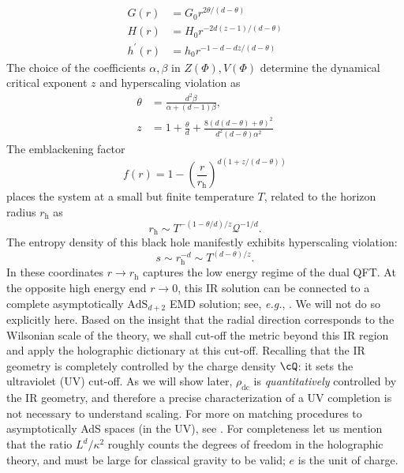 \documentclass[10pt, oneside]{book}
\begin{document}
\begin{doublespace}
\begin{subequations}
\begin{align}
G(r)&=G_0 r^{2\theta/(d-\theta)} \\
H(r)&= H_0 r^{-2d(z-1)/(d-\theta)}\\
h^\prime (r)&= h_0 r^{-1-d-dz/(d-\theta)}
\end{align}
\end{subequations}
The choice of the coefficients $\alpha,\beta$ in $Z(\Phi),V(\Phi)$ determine the dynamical critical exponent $z$ and hyperscaling violation as
\begin{subequations}\begin{align}
  \label{eq:19}
  \theta &= \frac{d^2\beta}{\alpha+(d-1)\beta} , \\
  z &=
  1+\frac{\theta}{d}+ \frac{8(d(d-\theta)+\theta)^2}{d^2(d-\theta)\alpha^2}
\end{align}\end{subequations}
The emblackening factor 
\begin{equation}
f(r)=  1-\left(\frac{r}{r_{\mathrm{h}}}\right)^{d(1+z/(d-\theta))}
\end{equation}
 places the system at a small but finite temperature $T$, related to the horizon radius $r_{\mathrm{h}}$ as 
\begin{equation}
r_{\mathrm{h}} \sim T^{-(1-\theta/d)/z} \mathcal{Q}^{-1/d}.
\end{equation}%
The entropy density of this black hole manifestly exhibits hyperscaling violation:
\begin{equation}
s \sim r_{\mathrm{h}}^{-d} \sim T^{(d-\theta)/z}.
\end{equation}
In these coordinates $r\rightarrow r_{\mathrm{h}}$ captures the low energy regime of the dual QFT. At the opposite high energy end $r\rightarrow 0$, this IR solution can be connected to a complete asymptotically $\mathrm{AdS}_{d+2}$ EMD solution; see, {\em e.g.\/}, \cite{Gubser:2009qt}.   We will not do so explicitly here.  Based on the insight that the radial direction corresponds to the Wilsonian scale of the theory, we shall cut-off the metric beyond this IR region and apply the holographic dictionary at this cut-off. Recalling that the IR geometry is completely controlled by the charge density $\cQ$: it sets the ultraviolet (UV) cut-off.
 As we will show later, $\rho_{\mathrm{dc}}$ is \emph{quantitatively} controlled by the IR geometry, and therefore a precise characterization of a UV completion is not necessary to understand scaling.  For more on matching procedures to asymptotically AdS spaces (in the UV), see \cite{Faulkner:2009wj}. 
For completeness let us mention that the ratio $L^d/\kappa^2$ roughly counts the degrees of freedom in the holographic theory, and must be large for classical gravity to be valid; $e$ is the unit of charge.


\end{doublespace}
\end{document}
